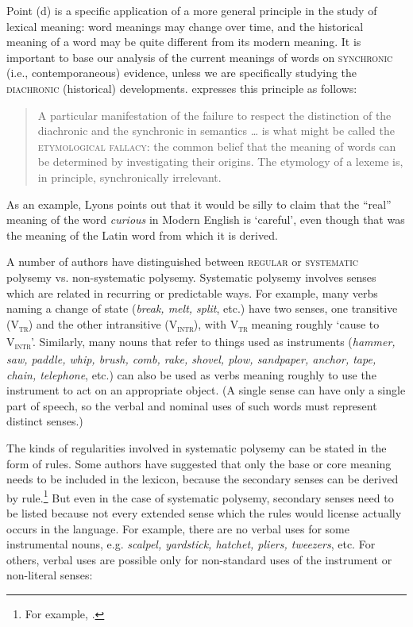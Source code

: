 Point (d) is a specific application of a more general principle in the study of lexical meaning: word meanings may change over time, and the historical meaning of a word may be quite different from its modern meaning. It is important to base our analysis of the current meanings of words on \textsc{synchronic} (i.e., contemporaneous) evidence, unless we are specifically studying the \textsc{diachronic} (historical) developments. \citet[244]{Lyons1977} expresses this principle as follows:


\begin{quote}
A particular manifestation of the failure to respect the distinction of the diachronic and the synchronic in semantics … is what might be called the \textsc{etymological fallacy}: the common belief that the meaning of words can be determined by investigating their origins. The etymology of a lexeme is, in principle, synchronically irrelevant.
\end{quote}


As an example, Lyons points out that it would be silly to claim that the “real” meaning of the word \textit{curious} in Modern English is ‘careful’, even though that was the meaning of the Latin word from which it is derived.



A number of authors have distinguished between \textsc{regular} or \textsc{systematic} polysemy vs. non-systematic polysemy. Systematic polysemy involves senses which are related in recurring or predictable ways. For example, many verbs naming a change of state (\textit{break, melt, split}, etc.) have two senses, one transitive (V\textsc{\textsubscript{tr}}) and the other intransitive (V\textsc{\textsubscript{intr}}), with V\textsc{\textsubscript{tr}} meaning roughly ‘cause to V\textsc{\textsubscript{intr}}’. Similarly, many nouns that refer to things used as instruments (\textit{hammer, saw, paddle, whip, brush, comb, rake, shovel, plow, sandpaper, anchor, tape, chain, telephone}, etc.) can also be used as verbs meaning roughly to use the instrument to act on an appropriate object. (A single sense can have only a single part of speech, so the verbal and nominal uses of such words must represent distinct senses.)



The kinds of regularities involved in systematic polysemy can be stated in the form of rules. Some authors have suggested that only the base or core meaning needs to be included in the lexicon, because the secondary senses can be derived by rule.\footnote{For example, \citet{Pustejovsky1995}.} But even in the case of systematic polysemy, secondary senses need to be listed because not every extended sense which the rules would license actually occurs in the language. For example, there are no verbal uses for some instrumental nouns, e.g. \textit{scalpel, yardstick, hatchet, pliers, tweezers}, etc. For others, verbal uses are possible only for non-standard uses of the instrument or non-literal senses:


